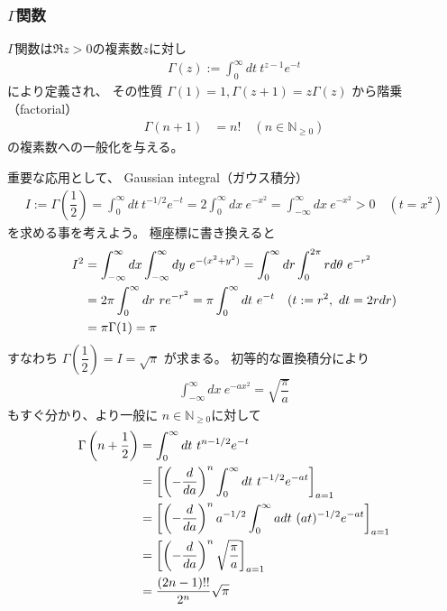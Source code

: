 \subsubsection{$\Gamma$関数}

$\Gamma$関数は$\Re z > 0$の複素数$z$に対し
\begin{align}
    \Gamma(z)
    := \int_0^\infty dt\ t^{z-1} e^{-t}
\end{align}
により定義され、
その性質
$\Gamma(1) = 1, \Gamma(z+1) = z\Gamma(z)$
から階乗（factorial）
\begin{align}
    \Gamma(n+1) &= n!
    \quad
    (n \in \mathbb{N}_{\ge0})
\end{align}
の複素数への一般化を与える。

重要な応用として、
Gaussian integral（ガウス積分）
\begin{align}
    I :=
    \Gamma\left(\dfrac{1}{2}\right)
    =
    \int_{0}^{\infty} dt\ t^{-1/2}e^{-t}
    =
    2
    \int_{0}^{\infty} dx\ e^{-x^2}
    =
    \int_{-\infty}^{\infty} dx\ e^{-x^2}
    > 0
    \quad(t=x^2)
\end{align}
を求める事を考えよう。
極座標に書き換えると
\begin{align}
    I^2 &=
    \int_{-\infty}^{\infty} dx
    \int_{-\infty}^{\infty} dy
    \ 
        e^{-(x^2 + y^2)}
=
    \int_0^{\infty} dr
    \int_0^{2\pi} r d\theta
    \ 
        e^{-r^2}
\notag\\&=
    2 \pi
    \int_0^{\infty} dr
    \ r 
        e^{-r^2}
=
    \pi
    \int_0^{\infty} dt\ e^{-t}
    \quad(t:=r^2,\ dt = 2 r dr)
\notag\\&=
    \pi\Gamma(1)
    = \pi
\end{align}
すなわち
$\Gamma\left(\dfrac{1}{2}\right)
= I = \sqrt{\pi}$
が求まる。
初等的な置換積分により
\begin{align}
    \int_{-\infty}^{\infty} dx\ e^{-ax^2}
    =
    \sqrt{
        \dfrac{\pi}{a}
    }
\label{gaussian integral}
\end{align}
もすぐ分かり、より一般に
$n \in \mathbb{N}_{\ge0}$に対して
\begin{align}
    \Gamma\left( n + \dfrac{1}{2} \right)
    &=
    \int_0^\infty dt\ t^{n-1/2} e^{-t}
\notag\\&=
    \left[
        \left(
            -
            \dfrac{d}{da}
        \right)^n
        \int_0^\infty dt\ t^{-1/2} e^{-at}
    \right]_{a=1}
\notag\\&=
    \left[
    \left(
        -
        \dfrac{d}{da}
    \right)^n
        a^{-1/2}
        \int_0^\infty a dt\ (at)^{-1/2} e^{-at}
    \right]_{a=1}
\notag\\&=
    \left[
    \left(
        -
        \dfrac{d}{da}
    \right)^n
    \sqrt{
        \dfrac{\pi}{a}
    }
    \right]_{a=1}
\notag\\&=
    \dfrac{(2n-1)!!}{2^{n}}\sqrt{\pi}
\label{Gamma function at half integer}
\end{align}
